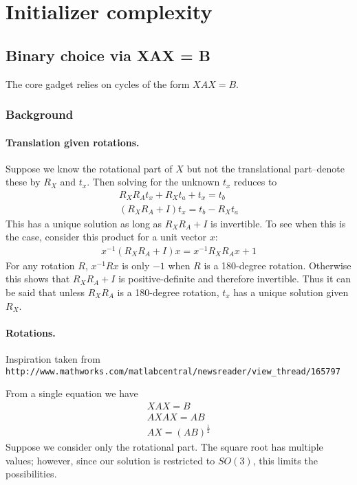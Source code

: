 \section{Initializer complexity}

\subsection{Binary choice via XAX = B}

The core gadget relies on cycles of the form $XAX = B$.

\subsubsection{Background}

\paragraph{Translation given rotations.}

Suppose we know the rotational part of $X$ but not the translational part--denote these by $R_X$ and $t_x$.
Then solving for the unknown $t_x$ reduces to
\begin{align}
	R_X R_A t_x + R_X t_a + t_x = t_b \\
	\left( R_X R_A + I \right) t_x = t_b - R_X t_a
\end{align} 
This has a unique solution as long as $R_X R_A + I$ is invertible. To see when this is the case,
consider this product for a unit vector $x$:
\begin{align}
	x^{-1} \left( R_X R_A + I \right) x = x^{-1} R_X R_A x + 1
\end{align}
For any rotation $R$, $x^{-1} R x$ is only $-1$ when $R$ is a 180-degree rotation.
Otherwise this shows that $R_X R_A + I$ is positive-definite and therefore invertible.
Thus it can be said that unless $R_X R_A$ is a 180-degree rotation, $t_x$ has a unique solution
given $R_X$.

\paragraph{Rotations.}
Inspiration taken from \\
\texttt{http://www.mathworks.com/matlabcentral/newsreader/view\_thread/165797}

From a single equation we have
\begin{align}
	XAX = B \\
	AXAX = AB \\
	AX = \left( AB \right)^\frac{1}{2}
\end{align}
Suppose we consider only the rotational part. 
The square root has multiple values; however, since our solution is restricted to 
$SO \left( 3 \right)$, this limits the possibilities.


